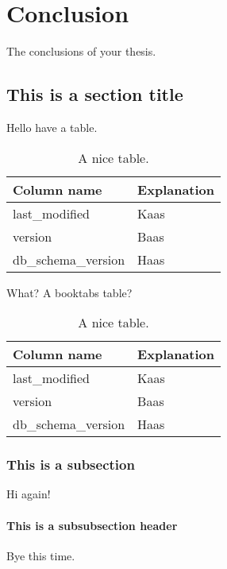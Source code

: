\chapter{Conclusion}
\label{conclusion}

The conclusions of your thesis.


\section{This is a section title}

Hello have a table.

\begin{table}[t]
	\caption{A nice table.}
	\begin{tabular}{|l|l|}
		\hline
		Column name         & Explanation \\ \hline
		last\_modified      & Kaas        \\ \hline
		version             & Baas        \\ \hline
		db\_schema\_version & Haas        \\ \hline
	\end{tabular}
\end{table}

What? A booktabs table?

\begin{table}[t]
	\caption{A nice table.}
	\begin{tabular}{@{}ll@{}}
		\toprule
		Column name         & Explanation \\ \midrule
		last\_modified      & Kaas        \\
		version             & Baas        \\
		db\_schema\_version & Haas        \\ \bottomrule
	\end{tabular}
\end{table}

\subsection{This is a subsection}

Hi again!

\subsubsection{This is a subsubsection header}

Bye this time.

